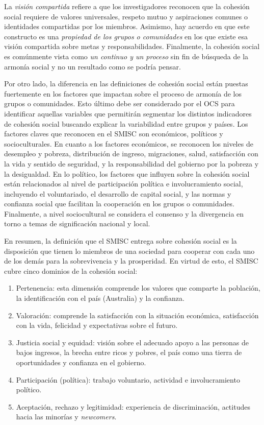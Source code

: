 \documentclass[
  12pt,
]{book}
\begin{document}
La \emph{visión compartida} refiere a que los investigadores reconocen que la cohesión social requiere de valores universales, respeto mutuo y aspiraciones comunes o identidades compartidas por los miembros. Asimismo, hay acuerdo en que este constructo es una \emph{propiedad de los grupos o comunidades} en los que existe esa visión compartida sobre metas y responsabilidades. Finalmente, la cohesión social es comúnmente vista como \emph{un continuo y un proceso} sin fin de búsqueda de la armonía social y no un resultado como se podría pensar.

Por otro lado, la diferencia en las definiciones de cohesión social están puestas fuertemente en los factores que impactan sobre el proceso de armonía de los grupos o comunidades. Esto último debe ser considerado por el OCS para identificar aquellas variables que permitirán segmentar los distintos indicadores de cohesión social buscando explicar la variabilidad entre grupos y países. Los factores claves que reconocen en el SMISC son económicos, políticos y socioculturales. En cuanto a los factores económicos, se reconocen los niveles de desempleo y pobreza, distribución de ingreso, migraciones, salud, satisfacción con la vida y sentido de seguridad, y la responsabilidad del gobierno por la pobreza y la desigualdad. En lo político, los factores que influyen sobre la cohesión social están relacionados al nivel de participación política e involucramiento social, incluyendo el voluntariado, el desarrollo de capital social, y las normas y confianza social que facilitan la cooperación en los grupos o comunidades. Finalmente, a nivel sociocultural se considera el consenso y la divergencia en torno a temas de significación nacional y local.

En resumen, la definición que el SMISC entrega sobre cohesión social es la disposición que tienen lo miembros de una sociedad para cooperar con cada uno de los demás para la sobrevivencia y la prosperidad. En virtud de esto, el SMISC cubre cinco dominios de la cohesión social:

\begin{enumerate}
\def\labelenumi{\arabic{enumi}.}
\item
  Pertenencia: esta dimensión comprende los valores que comparte la población, la identificación con el país (Australia) y la confianza.
\item
  Valoración: comprende la satisfacción con la situación económica, satisfacción con la vida, felicidad y expectativas sobre el futuro.
\item
  Justicia social y equidad: visión sobre el adecuado apoyo a las personas de bajos ingresos, la brecha entre ricos y pobres, el país como una tierra de oportunidades y confianza en el gobierno.
\item
  Participación (política): trabajo voluntario, actividad e involucramiento político.
\item
  Aceptación, rechazo y legitimidad: experiencia de discriminación, actitudes hacia las minorías y \emph{newcomers}.
\end{enumerate}
\end{document}
